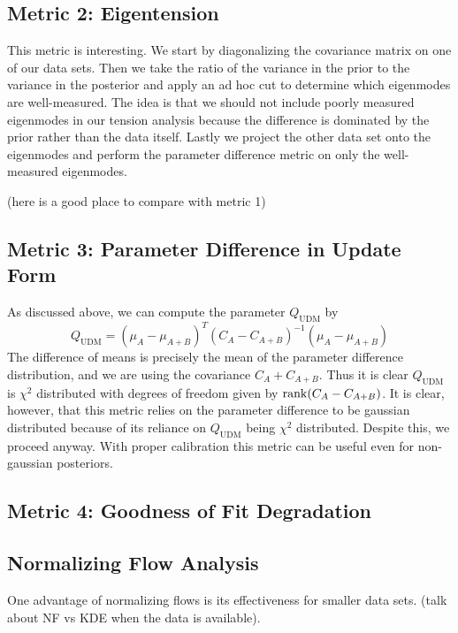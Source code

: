 \subsection{Metric 2: Eigentension}
This metric is interesting.
We start by diagonalizing the covariance matrix on one of our data sets.
Then we take the ratio of the variance in the prior to the variance in the posterior and apply an ad hoc cut to determine which eigenmodes are well-measured.
The idea is that we should not include poorly measured eigenmodes in our tension analysis because the difference is dominated by the prior rather than the data itself.
Lastly we project the other data set onto the eigenmodes and perform the parameter difference metric on only the well-measured eigenmodes.

(here is a good place to compare with metric 1)

\subsection{Metric 3: Parameter Difference in Update Form}
As discussed above, we can compute the parameter $Q_{\mathrm{UDM}}$ by
\begin{equation}
    Q_{\mathrm{UDM}} = {(\mu_A - \mu_{A+B})}^T{(C_A-C_{A+B})}^{-1}(\mu_A - \mu_{A+B}) 
\end{equation}
The difference of means is precisely the mean of the parameter difference distribution, and we are using the covariance $C_A+C_{A+B}$.
Thus it is clear $Q_{\mathrm{UDM}}$ is $\chi^2$ distributed with degrees of freedom given by $\rank(C_A-C_{A+B})$. 
It is clear, however, that this metric relies on the parameter difference to be gaussian distributed because of its reliance on $Q_{\mathrm{UDM}}$ being $\chi^2$ distributed. Despite this, we proceed anyway. With proper calibration this metric can be useful even for non-gaussian posteriors.

\subsection{Metric 4: Goodness of Fit Degradation}

\subsection{Normalizing Flow Analysis}
One advantage of normalizing flows is its effectiveness for smaller data sets. (talk about NF vs KDE when the data is available).



